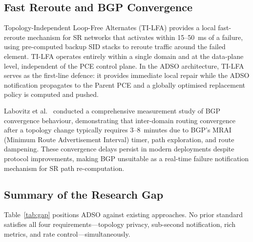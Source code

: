 \documentclass[conference]{IEEEtran}
\begin{document}
\subsection{Fast Reroute and BGP Convergence}

Topology-Independent Loop-Free Alternates (TI-LFA) \cite{b_tilfa}
provides a local fast-reroute mechanism for SR networks that activates
within 15--50~ms of a failure, using pre-computed backup SID stacks to
reroute traffic around the failed element. TI-LFA operates entirely
within a single domain and at the data-plane level, independent of the
PCE control plane. In the ADSO architecture, TI-LFA serves as the
first-line defence: it provides immediate local repair while the ADSO
notification propagates to the Parent PCE and a globally optimised
replacement policy is computed and pushed.

Labovitz et al.\ \cite{b_bgpconv} conducted a comprehensive measurement
study of BGP convergence behaviour, demonstrating that inter-domain
routing convergence after a topology change typically requires
3--8~minutes due to BGP's MRAI (Minimum Route Advertisement Interval)
timer, path exploration, and route dampening. These convergence delays
persist in modern deployments despite protocol improvements, making BGP
unsuitable as a real-time failure notification mechanism for SR path
re-computation.

\subsection{Summary of the Research Gap}

Table~\ref{tab:gap} positions ADSO against existing approaches. No
prior standard satisfies all four requirements---topology privacy,
sub-second notification, rich metrics, and rate control---simultaneously.
\end{document}
